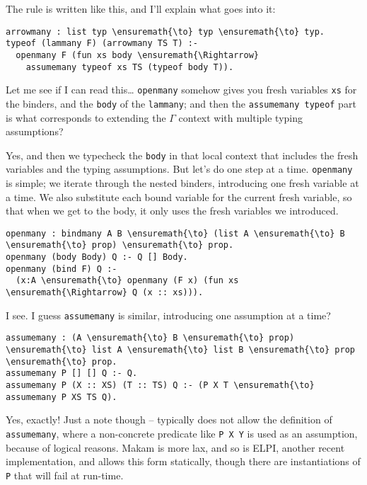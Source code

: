 \heroADVISOR{} The rule is written like this, and I'll explain what goes into
it:

\begin{verbatim}
arrowmany : list typ \ensuremath{\to} typ \ensuremath{\to} typ.
typeof (lammany F) (arrowmany TS T) :-
  openmany F (fun xs body \ensuremath{\Rightarrow}
    assumemany typeof xs TS (typeof body T)).
\end{verbatim}

\heroSTUDENT{} Let me see if I can read this\ldots{} \texttt{openmany} somehow
gives you fresh variables \texttt{xs} for the binders, and the
\texttt{body} of the \texttt{lammany}; and then the
\texttt{assumemany\ typeof} part is what corresponds to extending the
\(\Gamma\) context with multiple typing assumptions?

\heroADVISOR{} Yes, and then we typecheck the \texttt{body} in that local
context that includes the fresh variables and the typing assumptions.
But let's do one step at a time. \texttt{openmany} is simple; we iterate
through the nested binders, introducing one fresh variable at a time. We
also substitute each bound variable for the current fresh variable, so
that when we get to the body, it only uses the fresh variables we
introduced.

\begin{verbatim}
openmany : bindmany A B \ensuremath{\to} (list A \ensuremath{\to} B \ensuremath{\to} prop) \ensuremath{\to} prop.
openmany (body Body) Q :- Q [] Body.
openmany (bind F) Q :-
  (x:A \ensuremath{\to} openmany (F x) (fun xs \ensuremath{\Rightarrow} Q (x :: xs))).
\end{verbatim}

\heroSTUDENT{} I see. I guess \texttt{assumemany} is similar, introducing one
assumption at a time?

\begin{verbatim}
assumemany : (A \ensuremath{\to} B \ensuremath{\to} prop) \ensuremath{\to} list A \ensuremath{\to} list B \ensuremath{\to} prop \ensuremath{\to} prop.
assumemany P [] [] Q :- Q.
assumemany P (X :: XS) (T :: TS) Q :- (P X T \ensuremath{\to} assumemany P XS TS Q).
\end{verbatim}

\heroADVISOR{} Yes, exactly! Just a note though -- \lamprolog typically does
not allow the definition of \texttt{assumemany}, where a non-concrete
predicate like \texttt{P\ X\ Y} is used as an assumption, because of
logical reasons. Makam is more lax, and so is ELPI, another recent
\lamprolog implementation, and allows this form statically, though there
are instantiations of \texttt{P} that will fail at run-time.

